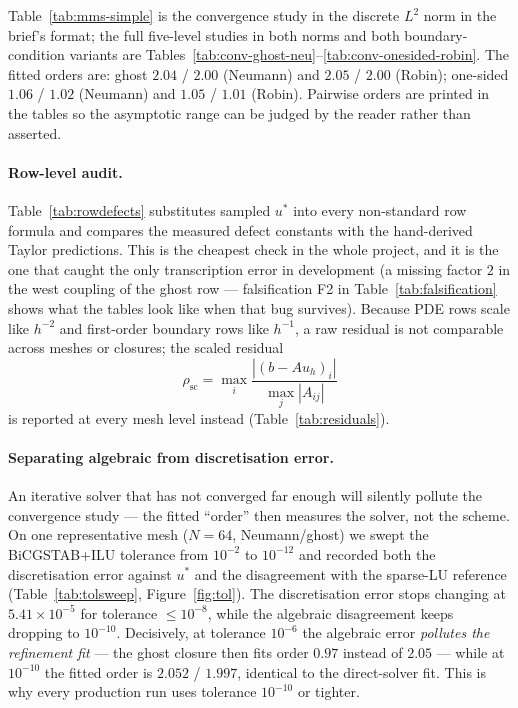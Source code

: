 \documentclass[11pt,a4paper]{article}
\begin{document}


Table~\ref{tab:mms-simple} is the convergence study in the discrete $L^2$
norm in the brief's format; the full five-level studies in both norms and
both boundary-condition variants are
Tables~\ref{tab:conv-ghost-neu}--\ref{tab:conv-onesided-robin}. The fitted
orders are: ghost $2.04$ / $2.00$ (Neumann) and $2.05$ / $2.00$ (Robin);
one-sided $1.06$ / $1.02$ (Neumann) and $1.05$ / $1.01$ (Robin). Pairwise
orders are printed in the tables so the asymptotic range can be judged by
the reader rather than asserted.






\paragraph{Row-level audit.} Table~\ref{tab:rowdefects} substitutes sampled
$u^*$ into every non-standard row formula and compares the measured defect
constants with the hand-derived Taylor predictions. This is the cheapest
check in the whole project, and it is the one that caught the only
transcription error in development (a missing factor $2$ in the west
coupling of the ghost row --- falsification F2 in
Table~\ref{tab:falsification} shows what the tables look like when that bug
survives). Because PDE rows scale like $h^{-2}$ and first-order boundary
rows like $h^{-1}$, a raw residual is not comparable across meshes or
closures; the scaled residual
\begin{equation}\label{eq:scaledresid}
\rho_{\mathrm{sc}} = \max_i \frac{|(b - A u_h)_i|}{\max_j |A_{ij}|}
\end{equation}
is reported at every mesh level instead (Table~\ref{tab:residuals}).




\paragraph{Separating algebraic from discretisation error.}
\label{sec:separation}
An iterative solver that has not converged far enough will silently pollute
the convergence study --- the fitted ``order'' then measures the solver, not
the scheme. On one representative mesh ($N = 64$, Neumann/ghost) we swept
the BiCGSTAB+ILU tolerance from $10^{-2}$ to $10^{-12}$ and recorded both
the discretisation error against $u^*$ and the disagreement with the
sparse-LU reference (Table~\ref{tab:tolsweep}, Figure~\ref{fig:tol}). The
discretisation error stops changing at $5.41\times10^{-5}$ for tolerance
$\le 10^{-8}$, while the algebraic disagreement keeps dropping to
$10^{-10}$. Decisively, at tolerance $10^{-6}$ the algebraic error
\emph{pollutes the refinement fit} --- the ghost closure then fits order
$0.97$ instead of $2.05$ --- while at $10^{-10}$ the fitted order is
$2.052$ / $1.997$, identical to the direct-solver fit. This is why every
production run uses tolerance $10^{-10}$ or tighter.
\end{document}
